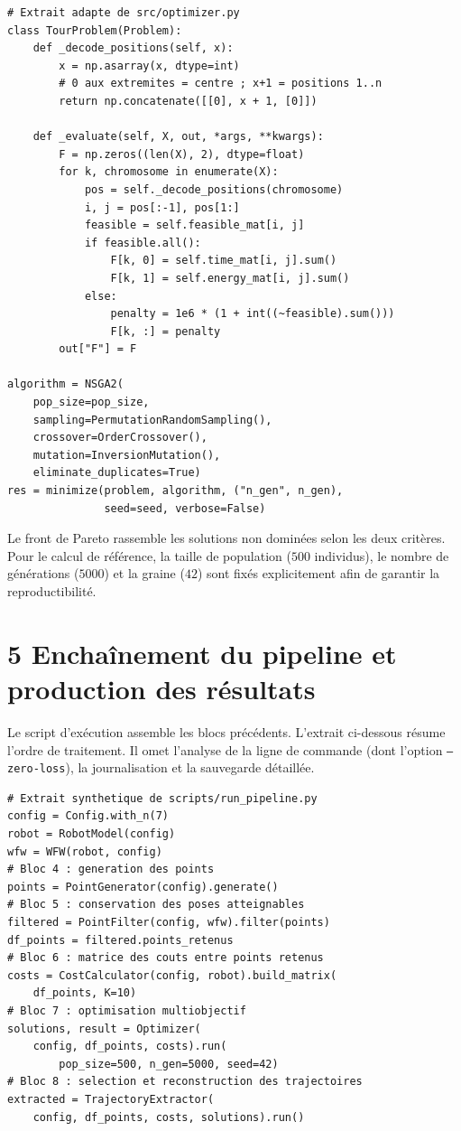 \begin{lstlisting}[caption={Codage d'une tournee et evaluation multiobjectif par NSGA-II},label={lst:B4}]
# Extrait adapte de src/optimizer.py
class TourProblem(Problem):
    def _decode_positions(self, x):
        x = np.asarray(x, dtype=int)
        # 0 aux extremites = centre ; x+1 = positions 1..n
        return np.concatenate([[0], x + 1, [0]])

    def _evaluate(self, X, out, *args, **kwargs):
        F = np.zeros((len(X), 2), dtype=float)
        for k, chromosome in enumerate(X):
            pos = self._decode_positions(chromosome)
            i, j = pos[:-1], pos[1:]
            feasible = self.feasible_mat[i, j]
            if feasible.all():
                F[k, 0] = self.time_mat[i, j].sum()
                F[k, 1] = self.energy_mat[i, j].sum()
            else:
                penalty = 1e6 * (1 + int((~feasible).sum()))
                F[k, :] = penalty
        out["F"] = F

algorithm = NSGA2(
    pop_size=pop_size,
    sampling=PermutationRandomSampling(),
    crossover=OrderCrossover(),
    mutation=InversionMutation(),
    eliminate_duplicates=True)
res = minimize(problem, algorithm, ("n_gen", n_gen),
               seed=seed, verbose=False)
\end{lstlisting}

Le front de Pareto rassemble les solutions non dominées selon les deux critères. Pour le calcul de référence, la taille de population ($500$ individus), le nombre de générations ($5000$) et la graine ($42$) sont fixés explicitement afin de garantir la reproductibilité.

\clearpage\section*{5 Enchaînement du pipeline et production des résultats}
\vspace{-0.3em}
Le script d'exécution assemble les blocs précédents. L'extrait ci-dessous résume l'ordre de traitement. Il omet l'analyse de la ligne de commande (dont l'option \texttt{--zero-loss}), la journalisation et la sauvegarde détaillée.

\begin{lstlisting}[caption={Sequence generale d'execution du pipeline Tandem},label={lst:5}]
# Extrait synthetique de scripts/run_pipeline.py
config = Config.with_n(7)
robot = RobotModel(config)
wfw = WFW(robot, config)
# Bloc 4 : generation des points
points = PointGenerator(config).generate()
# Bloc 5 : conservation des poses atteignables
filtered = PointFilter(config, wfw).filter(points)
df_points = filtered.points_retenus
# Bloc 6 : matrice des couts entre points retenus
costs = CostCalculator(config, robot).build_matrix(
    df_points, K=10)
# Bloc 7 : optimisation multiobjectif
solutions, result = Optimizer(
    config, df_points, costs).run(
        pop_size=500, n_gen=5000, seed=42)
# Bloc 8 : selection et reconstruction des trajectoires
extracted = TrajectoryExtractor(
    config, df_points, costs, solutions).run()\end{lstlisting}

